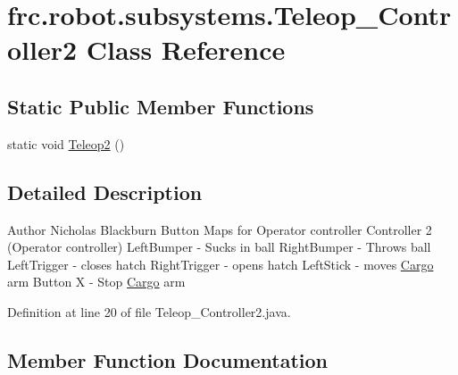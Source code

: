 \hypertarget{classfrc_1_1robot_1_1subsystems_1_1Teleop__Controller2}{}\section{frc.\+robot.\+subsystems.\+Teleop\+\_\+\+Controller2 Class Reference}
\label{classfrc_1_1robot_1_1subsystems_1_1Teleop__Controller2}
\subsection*{Static Public Member Functions}
\begin{DoxyCompactItemize}
\item 
static void \hyperlink{classfrc_1_1robot_1_1subsystems_1_1Teleop__Controller2_a2943912b4181f00e084af67a56f6837f}{Teleop2} ()
\end{DoxyCompactItemize}


\subsection{Detailed Description}
\begin{DoxyAuthor}{Author}
Nicholas Blackburn Button Maps for Operator controller Controller 2 (Operator controller) Left\+Bumper -\/ Sucks in ball Right\+Bumper -\/ Throws ball Left\+Trigger -\/ closes hatch Right\+Trigger -\/ opens hatch Left\+Stick -\/ moves \hyperlink{classfrc_1_1robot_1_1subsystems_1_1Cargo}{Cargo} arm Button X -\/ Stop \hyperlink{classfrc_1_1robot_1_1subsystems_1_1Cargo}{Cargo} arm 
\end{DoxyAuthor}


Definition at line 20 of file Teleop\+\_\+\+Controller2.\+java.



\subsection{Member Function Documentation}
\mbox{\label{classfrc_1_1robot_1_1subsystems_1_1Teleop__Controller2_a2943912b4181f00e084af67a56f6837f}} 
